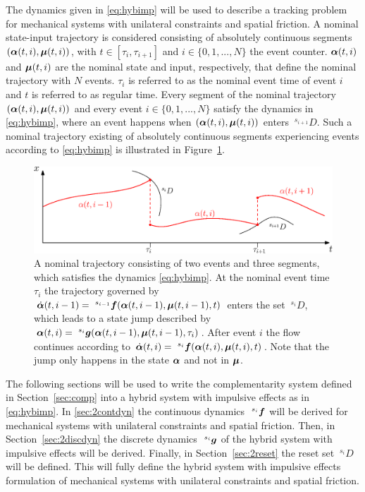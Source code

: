 \documentclass[../DC2017114Bouma.tex]{subfiles}
\begin{document}
The dynamics given in \eqref{eq:hybimp} will be used to describe a tracking problem for mechanical systems with unilateral constraints and spatial friction. A nominal state-input trajectory is considered consisting of absolutely continuous segments $(\boldsymbol{\alpha}(t,i),\boldsymbol{\mu}(t,i))$, with $t\in\left[\tau_i,\tau_{i+1}\right]$ and $i\in\{0,1,...,N\}$ the event counter. $\boldsymbol{\alpha}(t,i)$ and $\boldsymbol{\mu}(t,i)$ are the nominal state and input, respectively, that define the nominal trajectory with $N$ events. $\tau_i$ is referred to as the nominal event time of event $i$ and $t$ is referred to as regular time. Every segment of the nominal trajectory $(\boldsymbol{\alpha}(t,i),\boldsymbol{\mu}(t,i))$ and every event $i\in\{0,1,...,N\}$ satisfy the dynamics in \eqref{eq:hybimp}, where an event happens when $(\boldsymbol{\alpha}(t,i),\boldsymbol{\mu}(t,i))$ enters $\ ^{s_{i+1}}D$. Such a nominal trajectory existing of absolutely continuous segments experiencing events according to \eqref{eq:hybimp} is illustrated in Figure~\ref{fig:nomtraj}.

\begin{figure}[h]
\centering
\includegraphics[width=\textwidth]{nomtraj.eps}\caption{A nominal trajectory consisting of two events and three segments, which satisfies the dynamics \eqref{eq:hybimp}. At the nominal event time $\tau_i$ the trajectory governed by $\dot{\alphab}(t,i-1) =\ ^{s_{i-1}}\fb(\alphab(t,i-1),\mub(t,i-1),t)$ enters the set $\ ^{s_i}D$, which leads to a state jump described by $\alphab(t,i) = \ ^{s_i}\gb(\alphab(t,i-1),\mub(t,i-1),\tau_i)$. After event $i$ the flow continues according to $\dot{\alphab}(t,i) =\ ^{s_i}\fb(\alphab(t,i),\mub(t,i),t)$. Note that the jump only happens in the state $\boldsymbol{\alpha}$ and not in $\boldsymbol{\mu}$.} \label{fig:nomtraj}
\end{figure}

The following sections will be used to write the complementarity system defined in Section~\ref{sec:comp} into a hybrid system with impulsive effects as in \eqref{eq:hybimp}. In \ref{sec:2contdyn} the continuous dynamics $\ ^{s_i}{\boldsymbol{f}}$ will be derived for mechanical systems with unilateral constraints and spatial friction. Then, in Section~\ref{sec:2discdyn} the discrete dynamics $\ ^{s_i}{\boldsymbol{g}}$ of the hybrid system with impulsive effects will be derived. Finally, in Section~\ref{sec:2reset} the reset set $\ ^{s_i}D$ will be defined. This will fully define the hybrid system with impulsive effects formulation of mechanical systems with unilateral constraints and spatial friction.
\end{document}
